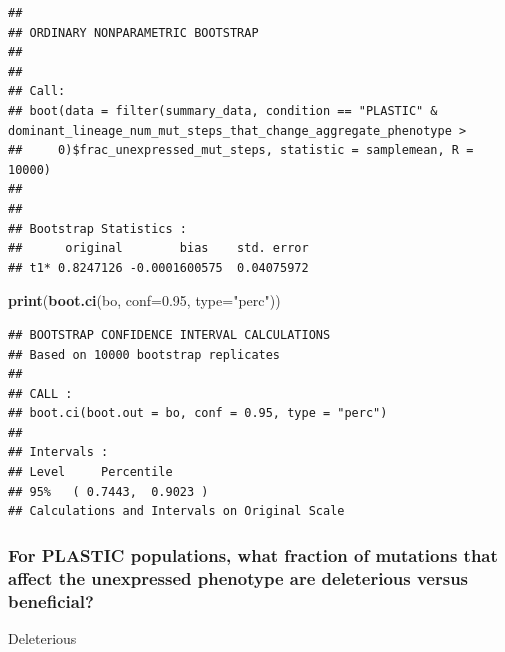 \documentclass[]{book}
\newenvironment{Shaded}{\begin{snugshade}}{\end{snugshade}}
\newcommand{\DataTypeTok}[1]{\textcolor[rgb]{0.13,0.29,0.53}{#1}}
\newcommand{\DecValTok}[1]{\textcolor[rgb]{0.00,0.00,0.81}{#1}}
\newcommand{\FloatTok}[1]{\textcolor[rgb]{0.00,0.00,0.81}{#1}}
\newcommand{\KeywordTok}[1]{\textcolor[rgb]{0.13,0.29,0.53}{\textbf{#1}}}
\newcommand{\NormalTok}[1]{#1}
\newcommand{\OperatorTok}[1]{\textcolor[rgb]{0.81,0.36,0.00}{\textbf{#1}}}
\newcommand{\StringTok}[1]{\textcolor[rgb]{0.31,0.60,0.02}{#1}}
\begin{document}
\begin{verbatim}
## 
## ORDINARY NONPARAMETRIC BOOTSTRAP
## 
## 
## Call:
## boot(data = filter(summary_data, condition == "PLASTIC" & dominant_lineage_num_mut_steps_that_change_aggregate_phenotype > 
##     0)$frac_unexpressed_mut_steps, statistic = samplemean, R = 10000)
## 
## 
## Bootstrap Statistics :
##      original        bias    std. error
## t1* 0.8247126 -0.0001600575  0.04075972
\end{verbatim}

\begin{Shaded}
\begin{Highlighting}[]
\KeywordTok{print}\NormalTok{(}\KeywordTok{boot.ci}\NormalTok{(bo, }\DataTypeTok{conf=}\FloatTok{0.95}\NormalTok{, }\DataTypeTok{type=}\StringTok{"perc"}\NormalTok{))}
\end{Highlighting}
\end{Shaded}

\begin{verbatim}
## BOOTSTRAP CONFIDENCE INTERVAL CALCULATIONS
## Based on 10000 bootstrap replicates
## 
## CALL : 
## boot.ci(boot.out = bo, conf = 0.95, type = "perc")
## 
## Intervals : 
## Level     Percentile     
## 95%   ( 0.7443,  0.9023 )  
## Calculations and Intervals on Original Scale
\end{verbatim}

\hypertarget{for-plastic-populations-what-fraction-of-mutations-that-affect-the-unexpressed-phenotype-are-deleterious-versus-beneficial}{%
\subsubsection{For PLASTIC populations, what fraction of mutations that affect the unexpressed phenotype are deleterious versus beneficial?}\label{for-plastic-populations-what-fraction-of-mutations-that-affect-the-unexpressed-phenotype-are-deleterious-versus-beneficial}}

Deleterious

\begin{Shaded}
\end{Shaded}
\end{document}
